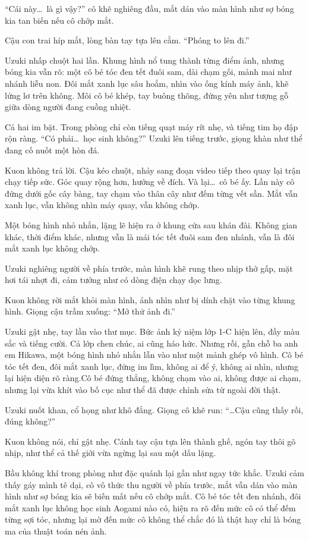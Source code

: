 \documentclass[../main.tex]{subfiles}
\begin{document}
``Cái này\dots\ là gì vậy?'' cô khẽ nghiêng đầu, mắt dán vào màn hình như sợ bóng kia tan biến nếu cô chớp mắt.

Cậu con trai híp mắt, lòng bàn tay tựa lên cằm. ``Phóng to lên đi.''

Uzuki nhấp chuột hai lần. Khung hình nổ tung thành từng điểm ảnh, nhưng bóng kia vẫn rõ: một cô bé tóc đen tết đuôi sam, dài chạm gối, mảnh mai như nhánh liễu non. Đôi mắt xanh lục sâu hoắm, nhìn vào ống kính máy ảnh, khẽ lửng lơ trên không. Môi cô bé khép, tay buông thõng, đứng yên như tượng gỗ giữa dòng người đang cuồng nhiệt.

Cả hai im bặt. Trong phòng chỉ còn tiếng quạt máy rít nhẹ, và tiếng tim họ đập rộn ràng. ``Có phải\dots\ học sinh không?'' Uzuki lên tiếng trước, giọng khàn như thể đang cố nuốt một hòn đá.

Kuon không trả lời. Cậu kéo chuột, nhảy sang đoạn video tiếp theo quay lại trận chạy tiếp sức. Góc quay rộng hơn, hướng về đích. Và lại\dots\ cô bé ấy. Lần này cô đứng dưới gốc cây bàng, tay chạm vào thân cây như đếm từng vết sần. Mắt vẫn xanh lục, vẫn không nhìn máy quay, vẫn không chớp.

Một bóng hình nhỏ nhắn, lặng lẽ hiện ra ở khung cửa sau khán đài. Không gian khác, thời điểm khác, nhưng vẫn là mái tóc tết đuôi sam đen nhánh, vẫn là đôi mắt xanh lục không chớp.

Uzuki nghiêng người về phía trước, màn hình khẽ rung theo nhịp thở gấp, mặt hơi tái nhợt đi, cảm tưởng như có dòng điện chạy dọc lưng.

Kuon không rời mắt khỏi màn hình, ánh nhìn như bị dính chặt vào từng khung hình. Giọng cậu trầm xuống: ``Mở thử ảnh đi.''

Uzuki gật nhẹ, tay lần vào thư mục. Bức ảnh kỷ niệm lớp 1-C hiện lên, đầy màu sắc và tiếng cười. Cả lớp chen chúc, ai cũng háo hức. Nhưng rồi, gần chỗ ba anh em Hikawa, một bóng hình nhỏ nhắn lẫn vào như một mảnh ghép vô hình. Cô bé tóc tết đen, đôi mắt xanh lục, đứng im lìm, không ai để ý, không ai nhìn, nhưng lại hiện diện rõ ràng.Cô bé đứng thẳng, không chạm vào ai, không được ai chạm, nhưng lại vừa khít vào bố cục như thể đã được chỉnh sửa từ ngoài đời thật.

Uzuki nuốt khan, cổ họng như khô đắng. Giọng cô khẽ run: ``\dots Cậu cũng thấy rồi, đúng không?''

Kuon không nói, chỉ gật nhẹ. Cánh tay cậu tựa lên thành ghế, ngón tay thôi gõ nhịp, như thể cả thế giới vừa ngừng lại sau một dấu lặng.

Bầu không khí trong phòng như đặc quánh lại gần như ngay tức khắc. Uzuki cảm thấy gáy mình tê dại, cô vô thức thu người về phía trước, mắt vẫn dán vào màn hình như sợ bóng kia sẽ biến mất nếu cô chớp mắt. Cô bé tóc tết đen nhánh, đôi mắt xanh lục không học sinh Aogami nào có, hiện ra rõ đến mức cô có thể đếm từng sợi tóc, nhưng lại mờ đến mức cô không thể chắc đó là thật hay chỉ là bóng ma của thuật toán nén ảnh.
\end{document}
